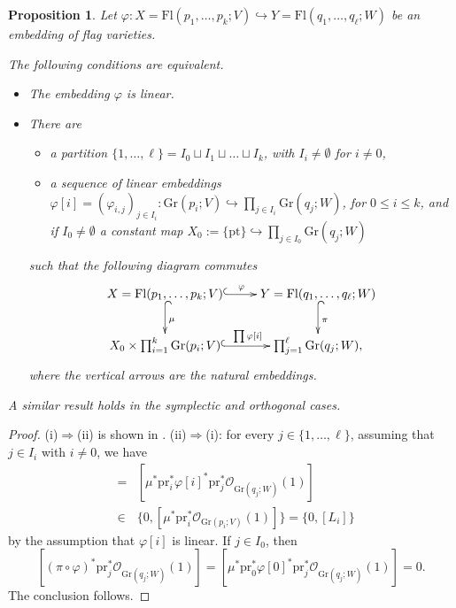 \documentclass[12pt]{amsart}
\newcommand{\Flags}{\mathrm{Fl}}
\newcommand{\Grass}{\mathrm{Gr}}
\newtheorem{proposition}[theorem]{Proposition}
\theoremstyle{definition}
\begin{document}
\begin{proposition}
\label{prop-linear}
Let $\varphi:X=\Flags(p_1,\ldots,p_k;V)\hookrightarrow Y=\Flags(q_1,\ldots,q_\ell;W)$ be an embedding of  flag varieties.

The following conditions are equivalent.
\begin{itemize}
\item[\rm (i)] The embedding $\varphi$ is linear.
\item[\rm (ii)] There are 
\begin{itemize}
\item[$\bullet$] a partition $\{1,\ldots,\ell\}=I_0\sqcup I_1\sqcup\ldots\sqcup I_{k}$, with $I_i\not=\emptyset$ for $i\not=0$, 
\item[$\bullet$] a sequence of linear embeddings $\varphi[i]=(\varphi_{i,j})_{j\in I_i}:\Grass(p_i;V)\hookrightarrow \prod_{j\in I_i}\Grass(q_j;W)$, for $0\leq i\leq k$, and if $I_0\not=\emptyset$ a constant map $X_0:=\{\mathrm{pt}\}\hookrightarrow\prod_{j\in I_0}\Grass(q_j;W)$ \end{itemize}
such that the following diagram commutes
\[
\xymatrix{X=\Flags(p_1,\ldots,p_k;V) \ar@{^{(}->}[r]^\varphi \ar@{^{(}->}[d]^\mu& Y=\Flags(q_1,\ldots,q_\ell;W) \ar@{^{(}->}[d]^\pi \\
X_0\times \prod_{i=1}^{k}\Grass(p_i;V) \ar@{^{(}->}[r]^{\quad\prod\varphi[i]} & \prod_{j=1}^{\ell}\Grass(q_j;W), }
\]
where the vertical arrows are the natural embeddings. 
\end{itemize}
A similar result holds in the symplectic and orthogonal cases.
\end{proposition}

\begin{proof}
(i)$\Rightarrow$(ii) is shown in \cite[Proposition 2.3]{PT}. 
(ii)$\Rightarrow$(i): for every $j\in\{1,\ldots,\ell\}$, assuming that $j\in I_i$ with $i\not=0$, we have
\begin{eqnarray*}
[(\pi\circ\varphi)^*\mathrm{pr}_j^*\mathcal{O}_{\Grass(q_j;W)}(1)] & = & 
[\mu^*\mathrm{pr}_i^*\varphi[i]^*\mathrm{pr}_j^*\mathcal{O}_{\Grass(q_j;W)}(1)] \\
 & \in & \{0,[\mu^*\mathrm{pr}_i^*\mathcal{O}_{\Grass(p_i;V)}(1)]\}=\{0,[L_i]\}
\end{eqnarray*}
by the assumption that $\varphi[i]$ is linear. If $j\in I_0$, then
\[[(\pi\circ\varphi)^*\mathrm{pr}_j^*\mathcal{O}_{\Grass(q_j;W)}(1)]= 
[\mu^*\mathrm{pr}_0^*\varphi[0]^*\mathrm{pr}_j^*\mathcal{O}_{\Grass(q_j;W)}(1)]=0.\] The conclusion follows.
\end{proof}
\end{document}
